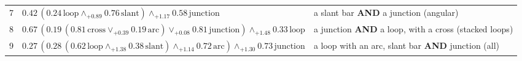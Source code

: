 \begin{table}[t]
\begin{center}
\begin{tabular}{c l l}
7 & $0.42\,(0.24\,\text{loop}\mathbin{\wedge}_{+0.89}0.76\,\text{slant})\mathbin{\wedge}_{+1.17}0.58\,\text{junction}$ & a slant bar \textbf{AND} a junction (angular) \\[3pt]
8 & $0.67\,(0.19\,(0.81\,\text{cross}\mathbin{\vee}_{+0.39}0.19\,\text{arc})\mathbin{\vee}_{+0.08}0.81\,\text{junction})\mathbin{\wedge}_{+1.48}0.33\,\text{loop}$ & a junction \textbf{AND} a loop, with a cross (stacked loops) \\[3pt]
9 & $0.27\,(0.28\,(0.62\,\text{loop}\mathbin{\wedge}_{+1.38}0.38\,\text{slant})\mathbin{\wedge}_{+1.14}0.72\,\text{arc})\mathbin{\wedge}_{+1.30}0.73\,\text{junction}$ & a loop with an arc, slant bar \textbf{AND} junction (all) \\[3pt]
\end{tabular}
\end{center}
\end{table}